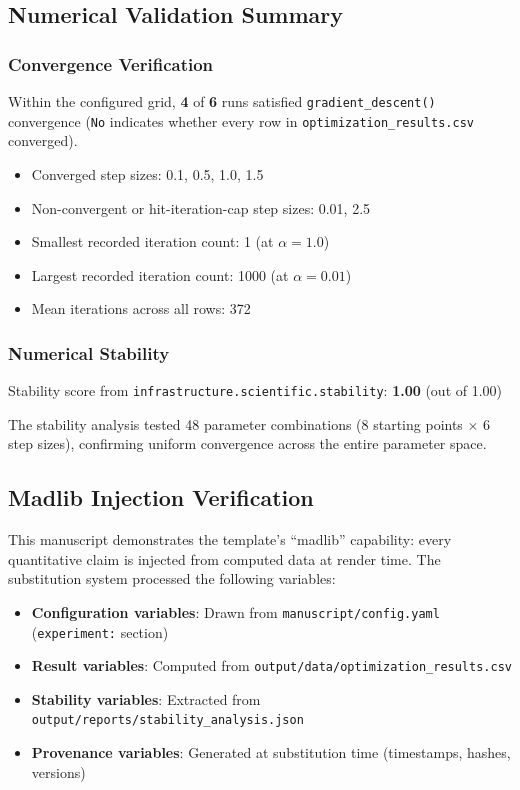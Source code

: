 \documentclass[
]{article}
\providecommand{\tightlist}{%
  \setlength{\itemsep}{0pt}\setlength{\parskip}{0pt}}
\begin{document}
\subsection{Numerical Validation
Summary}\label{numerical-validation-summary}

\subsubsection{Convergence Verification}\label{convergence-verification}

Within the configured grid, \textbf{4} of \textbf{6} runs satisfied
\texttt{gradient\_descent()} convergence (\texttt{No} indicates whether
every row in \texttt{optimization\_results.csv} converged).

\begin{itemize}
\tightlist
\item
  Converged step sizes: 0.1, 0.5, 1.0, 1.5
\item
  Non-convergent or hit-iteration-cap step sizes: 0.01, 2.5
\item
  Smallest recorded iteration count: 1 (at \(\alpha = 1.0\))
\item
  Largest recorded iteration count: 1000 (at \(\alpha = 0.01\))
\item
  Mean iterations across all rows: 372
\end{itemize}

\subsubsection{Numerical Stability}\label{numerical-stability}

Stability score from \texttt{infrastructure.scientific.stability}:
\textbf{1.00} (out of 1.00)

The stability analysis tested 48 parameter combinations (8 starting
points \(\times\) 6 step sizes), confirming uniform convergence across
the entire parameter space.

\subsection{Madlib Injection
Verification}\label{madlib-injection-verification}

This manuscript demonstrates the template's ``madlib'' capability: every
quantitative claim is injected from computed data at render time. The
substitution system processed the following variables:

\begin{itemize}
\tightlist
\item
  \textbf{Configuration variables}: Drawn from
  \texttt{manuscript/config.yaml} (\texttt{experiment:} section)
\item
  \textbf{Result variables}: Computed from
  \texttt{output/data/optimization\_results.csv}
\item
  \textbf{Stability variables}: Extracted from
  \texttt{output/reports/stability\_analysis.json}
\item
  \textbf{Provenance variables}: Generated at substitution time
  (timestamps, hashes, versions)
\end{itemize}
\end{document}
